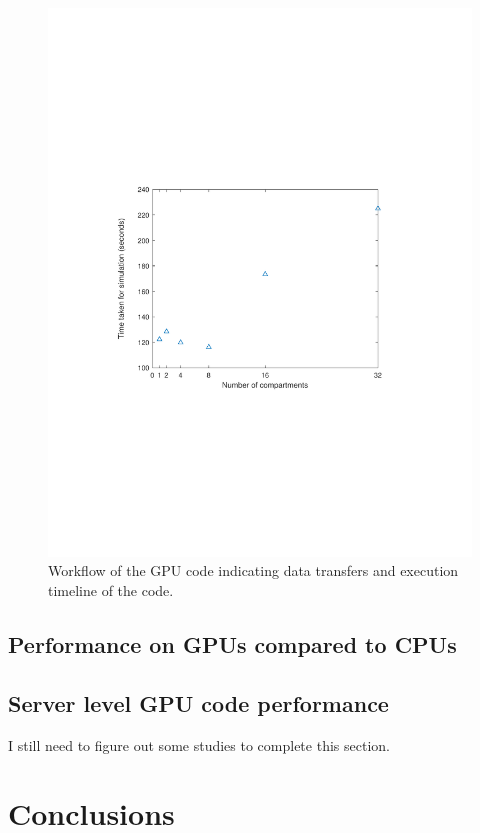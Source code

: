\documentclass[preprint,10pt,authoryear,review]{elsarticle}
\begin{document}
\begin{linenumbers}
\begin{figure}[h]
\centering
\includegraphics[scale=0.7,trim=110 220 120 220, clip]{desktopgputiming.pdf}
\caption{Workflow of the GPU code indicating data transfers and execution timeline of the code.}
\label{fig:res_gpu_timings}
\end{figure}

\subsection{Performance on GPUs compared to CPUs}

\subsection{Server level GPU code performance}



I still need to figure out some studies to complete this section.

\section{Conclusions}
\label{secConc}
\end{linenumbers}



\end{document}
